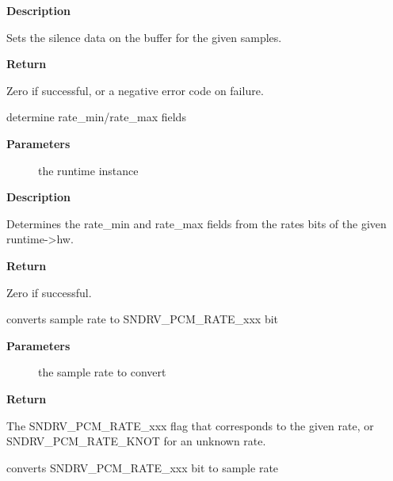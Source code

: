 \documentclass[a4paper,8pt,english]{sphinxmanual}
\begin{document}
\textbf{Description}

Sets the silence data on the buffer for the given samples.

\textbf{Return}

Zero if successful, or a negative error code on failure.

\begin{fulllineitems}
\label{sound/kernel-api/alsa-driver-api:c.snd_pcm_limit_hw_rates}
determine rate\_min/rate\_max fields

\end{fulllineitems}


\textbf{Parameters}
\begin{description}
\item[{}] \leavevmode
the runtime instance

\end{description}

\textbf{Description}

Determines the rate\_min and rate\_max fields from the rates bits of
the given runtime-\textgreater{}hw.

\textbf{Return}

Zero if successful.

\begin{fulllineitems}
\label{sound/kernel-api/alsa-driver-api:c.snd_pcm_rate_to_rate_bit}
converts sample rate to SNDRV\_PCM\_RATE\_xxx bit

\end{fulllineitems}


\textbf{Parameters}
\begin{description}
\item[{}] \leavevmode
the sample rate to convert

\end{description}

\textbf{Return}

The SNDRV\_PCM\_RATE\_xxx flag that corresponds to the given rate, or
SNDRV\_PCM\_RATE\_KNOT for an unknown rate.

\begin{fulllineitems}
\label{sound/kernel-api/alsa-driver-api:c.snd_pcm_rate_bit_to_rate}
converts SNDRV\_PCM\_RATE\_xxx bit to sample rate

\end{fulllineitems}
\end{document}
